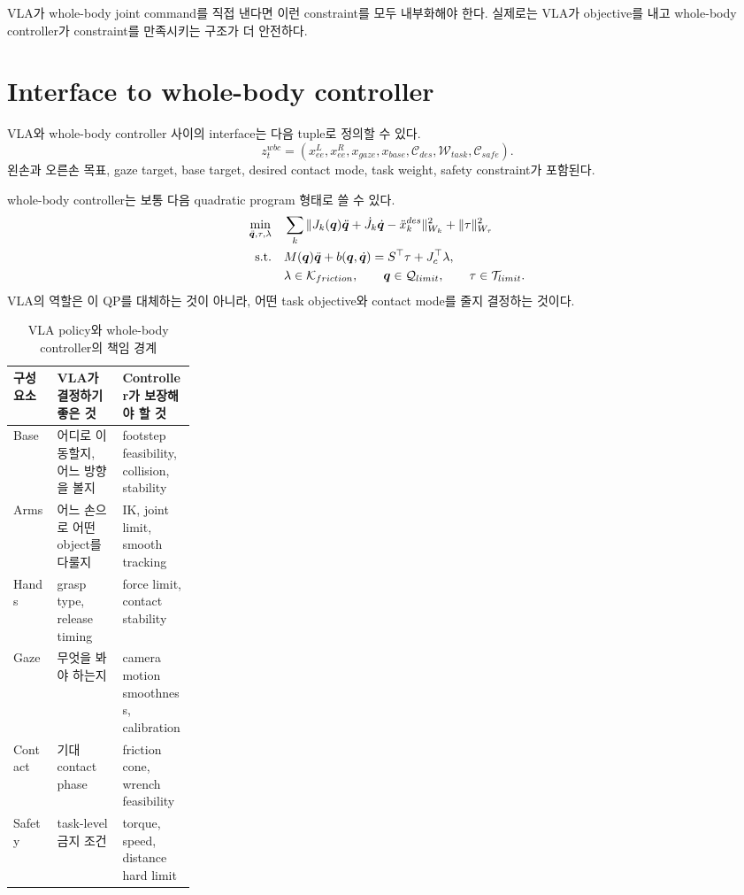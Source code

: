 VLA가 whole-body joint command를 직접 낸다면 이런 constraint를 모두 내부화해야 한다. 실제로는 VLA가 objective를 내고 whole-body controller가 constraint를 만족시키는 구조가 더 안전하다.

\section{Interface to whole-body controller}

VLA와 whole-body controller 사이의 interface는 다음 tuple로 정의할 수 있다.
\begin{equation}
  z_t^{wbc}
  =
  (
  x_{ee}^{L},
  x_{ee}^{R},
  x_{gaze},
  x_{base},
  \mathcal{C}_{des},
  \mathcal{W}_{task},
  \mathcal{C}_{safe}
  ).
  \label{eq:ch20-wbc-interface}
\end{equation}
왼손과 오른손 목표, gaze target, base target, desired contact mode, task weight, safety constraint가 포함된다.

whole-body controller는 보통 다음 quadratic program 형태로 쓸 수 있다.
\begin{equation}
  \begin{aligned}
  \min_{\ddot{\bm{q}},\tau,\lambda}
  \quad&
  \sum_{k}
  \|J_k(\bm{q})\ddot{\bm{q}}+\dot{J}_k\dot{\bm{q}}-\ddot{x}_k^{des}\|_{W_k}^{2}
  +
  \|\tau\|_{W_{\tau}}^{2}
  \\
  \mathrm{s.t.}\quad&
  M(\bm{q})\ddot{\bm{q}}+b(\bm{q},\dot{\bm{q}})
  =
  S^{\top}\tau + J_c^{\top}\lambda,
  \\
  &
  \lambda \in \mathcal{K}_{friction},
  \qquad
  \bm{q} \in \mathcal{Q}_{limit},
  \qquad
  \tau \in \mathcal{T}_{limit}.
  \end{aligned}
  \label{eq:ch20-wbc-qp}
\end{equation}
VLA의 역할은 이 QP를 대체하는 것이 아니라, 어떤 task objective와 contact mode를 줄지 결정하는 것이다.

\begin{table}[h]
  \centering
  \caption{VLA policy와 whole-body controller의 책임 경계}
  \begin{tabularx}{\linewidth}{p{0.24\linewidth}X X}
    \toprule
    구성 요소 & VLA가 결정하기 좋은 것 & Controller가 보장해야 할 것 \\
    \midrule
    Base & 어디로 이동할지, 어느 방향을 볼지 & footstep feasibility, collision, stability \\
    Arms & 어느 손으로 어떤 object를 다룰지 & IK, joint limit, smooth tracking \\
    Hands & grasp type, release timing & force limit, contact stability \\
    Gaze & 무엇을 봐야 하는지 & camera motion smoothness, calibration \\
    Contact & 기대 contact phase & friction cone, wrench feasibility \\
    Safety & task-level 금지 조건 & torque, speed, distance hard limit \\
    \bottomrule
  \end{tabularx}
  \label{tab:ch20-vla-wbc}
\end{table}


